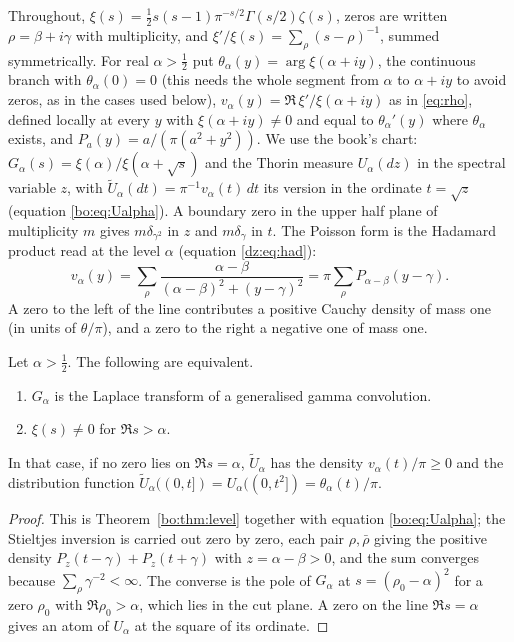Throughout, $\xi(s)=\frac12s(s-1)\pi^{-s/2}\Gamma(s/2)\zeta(s)$, zeros are written $\rho=\beta+i\gamma$ with multiplicity, and $\xi'/\xi(s)=\sum_\rho(s-\rho)^{-1}$, summed symmetrically. For real $\alpha>\frac12$ put $\theta_\alpha(y)=\arg\xi(\alpha+iy)$, the continuous branch with $\theta_\alpha(0)=0$ (this needs the whole segment from $\alpha$ to $\alpha+iy$ to avoid zeros, as in the cases used below), $v_\alpha(y)=\Re\,\xi'/\xi(\alpha+iy)$ as in \eqref{eq:rho}, defined locally at every $y$ with $\xi(\alpha+iy)\ne0$ and equal to $\theta_\alpha'(y)$ where $\theta_\alpha$ exists, and $P_a(y)=a/(\pi(a^2+y^2))$. We use the book's chart: $G_\alpha(s)=\xi(\alpha)/\xi(\alpha+\sqrt s)$ and the Thorin measure $U_\alpha(dz)$ in the spectral variable $z$, with $\widetilde U_\alpha(dt)=\pi^{-1}v_\alpha(t)\,dt$ its version in the ordinate $t=\sqrt z$ (equation \eqref{bo:eq:Ualpha}). A boundary zero in the upper half plane of multiplicity $m$ gives $m\delta_{\gamma^2}$ in $z$ and $m\delta_\gamma$ in $t$. The Poisson form is the Hadamard product read at the level $\alpha$ (equation \eqref{dz:eq:had}):
\begin{equation}\label{qt:eq:poisson}
v_\alpha(y)=\sum_\rho\frac{\alpha-\beta}{(\alpha-\beta)^2+(y-\gamma)^2}=\pi\sum_\rho P_{\alpha-\beta}(y-\gamma).
\end{equation}
A zero to the left of the line contributes a positive Cauchy density of mass one (in units of $\theta/\pi$), and a zero to the right a negative one of mass one.

\begin{theorem}\label{qt:thm:ggc}
Let $\alpha>\frac12$. The following are equivalent.
\begin{enumerate}
\item $G_\alpha$ is the Laplace transform of a generalised gamma convolution.
\item $\xi(s)\ne0$ for $\Re s>\alpha$.
\end{enumerate}
In that case, if no zero lies on $\Re s=\alpha$, $\widetilde U_\alpha$ has the density $v_\alpha(t)/\pi\ge0$ and the distribution function $\widetilde U_\alpha((0,t])=U_\alpha((0,t^2])=\theta_\alpha(t)/\pi$.
\end{theorem}

\begin{proof}
This is Theorem~\ref{bo:thm:level} together with equation \eqref{bo:eq:Ualpha}; the Stieltjes inversion is carried out zero by zero, each pair $\rho,\bar\rho$ giving the positive density $P_z(t-\gamma)+P_z(t+\gamma)$ with $z=\alpha-\beta>0$, and the sum converges because $\sum_\rho\gamma^{-2}<\infty$. The converse is the pole of $G_\alpha$ at $s=(\rho_0-\alpha)^2$ for a zero $\rho_0$ with $\Re\rho_0>\alpha$, which lies in the cut plane. A zero on the line $\Re s=\alpha$ gives an atom of $U_\alpha$ at the square of its ordinate.
\end{proof}

